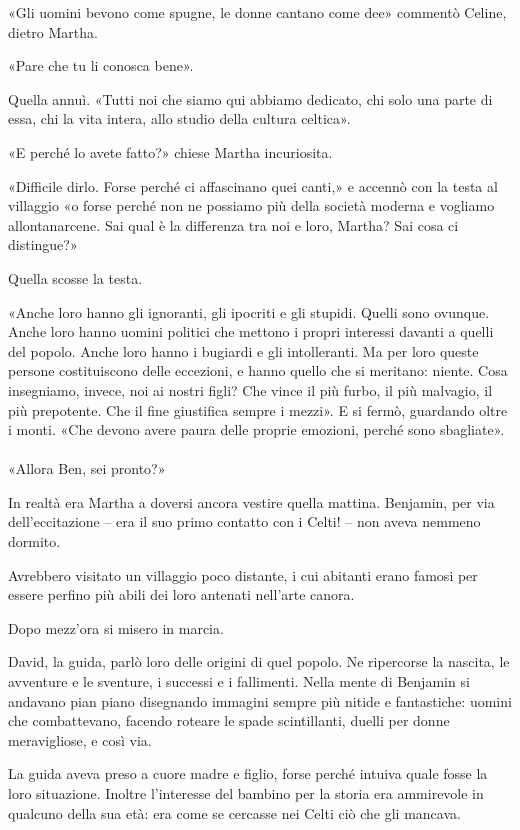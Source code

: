 \documentclass[a4paper,12pt]{book}
\begin{document}
«Gli uomini bevono come spugne, le donne cantano come dee» commentò Celine,
dietro Martha.

«Pare che tu li conosca bene».

Quella annuì. «Tutti noi che siamo qui abbiamo dedicato, chi solo una parte di
essa, chi la vita intera, allo studio della cultura celtica».

«E perché lo avete fatto?» chiese Martha incuriosita.

«Difficile dirlo. Forse perché ci affascinano quei canti,» e accennò con la
testa al villaggio «o forse perché non ne possiamo più della società moderna
e vogliamo allontanarcene. Sai qual è la differenza tra noi e loro, Martha? Sai
cosa ci distingue?»

Quella scosse la testa.

«Anche loro hanno gli ignoranti, gli ipocriti e gli stupidi. Quelli sono
ovunque. Anche loro hanno uomini politici che mettono i propri interessi davanti
a quelli del popolo. Anche loro hanno i bugiardi e gli intolleranti. Ma per loro
queste persone costituiscono delle eccezioni, e hanno quello che si meritano:
niente. Cosa insegniamo, invece, noi ai nostri figli? Che vince il più furbo,
il più malvagio, il più prepotente. Che il fine giustifica sempre i mezzi». E
si fermò, guardando oltre i monti. «Che devono avere paura delle proprie
emozioni, perché sono sbagliate».

\paragraph{}
«Allora Ben, sei pronto?»

In realtà era Martha a doversi ancora vestire quella mattina. Benjamin, per via
dell'eccitazione -- era il suo primo contatto con i Celti! -- non aveva
nemmeno dormito.

Avrebbero visitato un villaggio poco distante, i cui abitanti erano famosi per
essere perfino più abili dei loro antenati nell'arte canora.

Dopo mezz'ora si misero in marcia.

David, la guida, parlò loro delle origini di quel popolo. Ne ripercorse la
nascita, le avventure e le sventure, i successi e i fallimenti. Nella mente di
Benjamin si andavano pian piano disegnando immagini sempre più nitide e
fantastiche: uomini che combattevano, facendo roteare le spade scintillanti,
duelli per donne meravigliose, e così via.

La guida aveva preso a cuore madre e figlio, forse perché intuiva quale fosse
la loro situazione. Inoltre l'interesse del bambino per la storia era ammirevole
in qualcuno della sua età: era come se cercasse nei Celti ciò che gli mancava.
\end{document}
